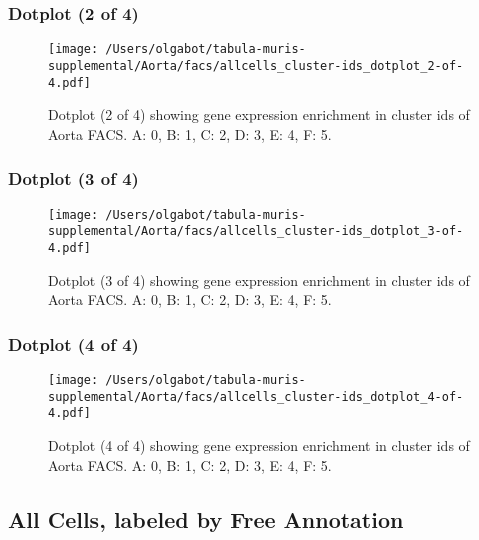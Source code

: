 \clearpage
\clearpage
\subsubsection{Dotplot (2 of 4)}
\begin{figure}[h]
\centering
\texttt{[image: /Users/olgabot/tabula-muris-supplemental/Aorta/facs/allcells\_cluster-ids\_dotplot\_2-of-4.pdf]}

\caption{ Dotplot (2 of 4)  showing gene expression enrichment in cluster ids of Aorta FACS. A: 0, B: 1, C: 2, D: 3, E: 4, F: 5.}
\end{figure}


\clearpage
\clearpage
\subsubsection{Dotplot (3 of 4)}
\begin{figure}[h]
\centering
\texttt{[image: /Users/olgabot/tabula-muris-supplemental/Aorta/facs/allcells\_cluster-ids\_dotplot\_3-of-4.pdf]}

\caption{ Dotplot (3 of 4)  showing gene expression enrichment in cluster ids of Aorta FACS. A: 0, B: 1, C: 2, D: 3, E: 4, F: 5.}
\end{figure}


\clearpage
\clearpage
\subsubsection{Dotplot (4 of 4)}
\begin{figure}[h]
\centering
\texttt{[image: /Users/olgabot/tabula-muris-supplemental/Aorta/facs/allcells\_cluster-ids\_dotplot\_4-of-4.pdf]}

\caption{ Dotplot (4 of 4)  showing gene expression enrichment in cluster ids of Aorta FACS. A: 0, B: 1, C: 2, D: 3, E: 4, F: 5.}
\end{figure}


\clearpage
\subsection{All Cells, labeled by Free Annotation}
